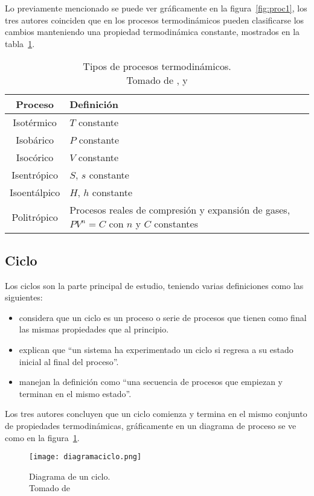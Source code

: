 \vspace{-42pt}
Lo previamente mencionado se puede ver gráficamente en la figura~\ref{fig:proc1}, los tres autores coinciden que en los procesos termodinámicos pueden clasificarse los cambios manteniendo una propiedad termodinámica constante, mostrados en la tabla~\ref{tab:proctermo1}.

\begin{table}[H]
    \centering
    \caption{Tipos de procesos termodinámicos. \\ Tomado de \textcite{ccengel2006termodinamica}, \textcite{rajput2009engineering} y \textcite{burghardt1984ingenieria}}
    \label{tab:proctermo1}

    \begin{tabular}{cp{7cm}}
        \hline
        Proceso & Definición \\ 
        \hline
        Isotérmico & \( T \) constante \\ 
        Isobárico & \( P \) constante \\ 
        Isocórico &  \( V \) constante \\ 
        Isentrópico & \( S,\,s \) constante \\ 
        Isoentálpico & \( H,\,h \) constante \\ 
        Politrópico & Procesos reales de compresión y expansión de gases, \( PV^{n}=C \) con \( n \) y \( C \) constantes  \\ 
        \hline
    \end{tabular}
\end{table}

\subsection{Ciclo}

Los ciclos son la parte principal de estudio, teniendo varias definiciones como las siguientes:

\begin{itemize}
    \item \textcite{rajput2009engineering} considera que un ciclo es un proceso o serie de procesos que tienen como final las mismas propiedades que al principio.
    \item \textcite{ccengel2006termodinamica} explican que ``un sistema ha experimentado un ciclo si regresa a su estado inicial al final del proceso''.
    \item \textcite{shapirotermo} manejan la definición como ``una secuencia de procesos que empiezan y terminan en el mismo estado''.
\end{itemize}

Los tres autores concluyen que un ciclo comienza y termina en el mismo conjunto de propiedades termodinámicas, gráficamente en un diagrama de proceso se ve como en la figura~\ref{fig:ciclo1}.


\begin{figure}[H]
    \centering
    \texttt{[image: diagramaciclo.png]}
    \caption{Diagrama de un ciclo. \\ Tomado de \textcite{rajput2009engineering}}
    \label{fig:ciclo1}
\end{figure}



